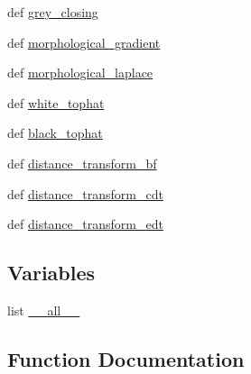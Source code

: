 \begin{DoxyCompactItemize}
def \hyperlink{namespacescipy_1_1ndimage_1_1morphology_aca27b5c4bf8c5f31da94b6fe9ed84618}{grey\+\_\+closing}
\item 
def \hyperlink{namespacescipy_1_1ndimage_1_1morphology_a6b250101c90d40b2de24bbafe9e456a8}{morphological\+\_\+gradient}
\item 
def \hyperlink{namespacescipy_1_1ndimage_1_1morphology_a7616378b49db68c1226516a3cab54adf}{morphological\+\_\+laplace}
\item 
def \hyperlink{namespacescipy_1_1ndimage_1_1morphology_a50c956aece0670c09720de47ca8d9203}{white\+\_\+tophat}
\item 
def \hyperlink{namespacescipy_1_1ndimage_1_1morphology_a56e8af16251eeec0f7b62be209932d39}{black\+\_\+tophat}
\item 
def \hyperlink{namespacescipy_1_1ndimage_1_1morphology_af64dbb993fb6557a0689c6cad2efe85c}{distance\+\_\+transform\+\_\+bf}
\item 
def \hyperlink{namespacescipy_1_1ndimage_1_1morphology_a4bd735f088e7d13288ba9d0c6da58b3e}{distance\+\_\+transform\+\_\+cdt}
\item 
def \hyperlink{namespacescipy_1_1ndimage_1_1morphology_a95bbbdb599ff1793aa9a4a4141e2953c}{distance\+\_\+transform\+\_\+edt}
\end{DoxyCompactItemize}
\subsection*{Variables}
\begin{DoxyCompactItemize}
\item 
list \hyperlink{namespacescipy_1_1ndimage_1_1morphology_a51ef986225fadb5aa25aa062dba80eea}{\+\_\+\+\_\+all\+\_\+\+\_\+}
\end{DoxyCompactItemize}


\subsection{Function Documentation}
\hypertarget{namespacescipy_1_1ndimage_1_1morphology_a1c44029fb38a136a4857e1bd8b2e9e4b}{}
